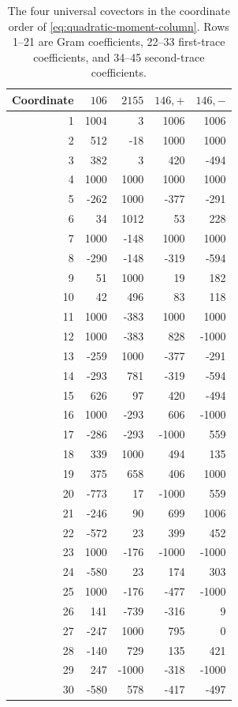 \begin{table}[p]
\centering\small
\caption{The four universal covectors in the coordinate order of \eqref{eq:quadratic-moment-column}. Rows 1--21 are Gram coefficients, 22--33 first-trace coefficients, and 34--45 second-trace coefficients.}\label{tab:quadratic-separators}
\begin{tabular}{r r r r r}\toprule
Coordinate & $106$ & $2155$ & $146,+$ & $146,-$\\\midrule
1 & 1004 & 3 & 1006 & 1006\\
2 & 512 & -18 & 1000 & 1000\\
3 & 382 & 3 & 420 & -494\\
4 & 1000 & 1000 & 1000 & 1000\\
5 & -262 & 1000 & -377 & -291\\
6 & 34 & 1012 & 53 & 228\\
7 & 1000 & -148 & 1000 & 1000\\
8 & -290 & -148 & -319 & -594\\
9 & 51 & 1000 & 19 & 182\\
10 & 42 & 496 & 83 & 118\\
11 & 1000 & -383 & 1000 & 1000\\
12 & 1000 & -383 & 828 & -1000\\
13 & -259 & 1000 & -377 & -291\\
14 & -293 & 781 & -319 & -594\\
15 & 626 & 97 & 420 & -494\\
16 & 1000 & -293 & 606 & -1000\\
17 & -286 & -293 & -1000 & 559\\
18 & 339 & 1000 & 494 & 135\\
19 & 375 & 658 & 406 & 1000\\
20 & -773 & 17 & -1000 & 559\\
21 & -246 & 90 & 699 & 1006\\
\midrule
22 & -572 & 23 & 399 & 452\\
23 & 1000 & -176 & -1000 & -1000\\
24 & -580 & 23 & 174 & 303\\
25 & 1000 & -176 & -477 & -1000\\
26 & 141 & -739 & -316 & 9\\
27 & -247 & 1000 & 795 & 0\\
28 & -140 & 729 & 135 & 421\\
29 & 247 & -1000 & -318 & -1000\\
30 & -580 & 578 & -417 & -497\\

\end{tabular}
\end{table}
